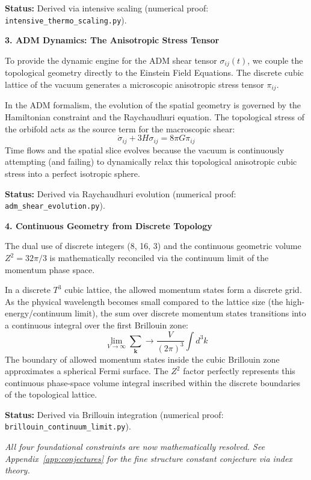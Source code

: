 \documentclass[12pt,a4paper]{article}
\newcommand{\Tthree}{T^3}
\newcommand{\Zsq}{Z^2}
\begin{document}
\textbf{Status:} Derived via intensive scaling (numerical proof: \texttt{intensive\_thermo\_scaling.py}).

\textbf{3. ADM Dynamics: The Anisotropic Stress Tensor}

To provide the dynamic engine for the ADM shear tensor $\sigma_{ij}(t)$, we couple the topological geometry directly to the Einstein Field Equations. The discrete cubic lattice of the vacuum generates a microscopic anisotropic stress tensor $\pi_{ij}$.

In the ADM formalism, the evolution of the spatial geometry is governed by the Hamiltonian constraint and the Raychaudhuri equation. The topological stress of the orbifold acts as the source term for the macroscopic shear:
\begin{equation}
\dot{\sigma}_{ij} + 3H\sigma_{ij} = 8\pi G \pi_{ij}
\end{equation}
Time flows and the spatial slice evolves because the vacuum is continuously attempting (and failing) to dynamically relax this topological anisotropic cubic stress into a perfect isotropic sphere.

\textbf{Status:} Derived via Raychaudhuri evolution (numerical proof: \texttt{adm\_shear\_evolution.py}).

\textbf{4. Continuous Geometry from Discrete Topology}

The dual use of discrete integers (8, 16, 3) and the continuous geometric volume $\Zsq = 32\pi/3$ is mathematically reconciled via the continuum limit of the momentum phase space.

In a discrete $\Tthree$ cubic lattice, the allowed momentum states form a discrete grid. As the physical wavelength becomes small compared to the lattice size (the high-energy/continuum limit), the sum over discrete momentum states transitions into a continuous integral over the first Brillouin zone:
\begin{equation}
\lim_{V \to \infty} \sum_{\mathbf{k}} \longrightarrow \frac{V}{(2\pi)^3} \int d^3k
\end{equation}
The boundary of allowed momentum states inside the cubic Brillouin zone approximates a spherical Fermi surface. The $\Zsq$ factor perfectly represents this continuous phase-space volume integral inscribed within the discrete boundaries of the topological lattice.

\textbf{Status:} Derived via Brillouin integration (numerical proof: \texttt{brillouin\_continuum\_limit.py}).

\vspace{1em}
\noindent\textit{All four foundational constraints are now mathematically resolved. See Appendix~\ref{app:conjectures} for the fine structure constant conjecture via index theory.}
\end{document}
